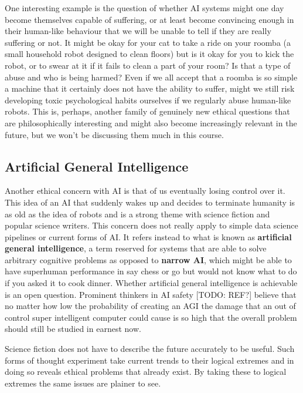 \documentclass[
]{book}
\theoremstyle{definition}
\theoremstyle{definition}
\theoremstyle{definition}
\theoremstyle{definition}
\theoremstyle{remark}
\begin{document}
One interesting example is the question of whether AI systems might one day become themselves capable of suffering, or at least become convincing enough in their human-like behaviour that we will be unable to tell if they are really suffering or not. It might be okay for your cat to take a ride on your roomba (a small household robot designed to clean floors) but is it okay for you to kick the robot, or to swear at it if it fails to clean a part of your room? Is that a type of abuse and who is being harmed? Even if we all accept that a roomba is so simple a machine that it certainly does not have the ability to suffer, might we still risk developing toxic psychological habits ourselves if we regularly abuse human-like robots. This is, perhaps, another family of genuinely new ethical questions that are philosophically interesting and might also become increasingly relevant in the future, but we won't be discussing them much in this course.

\hypertarget{artificial-general-intelligence}{%
\subsection{Artificial General Intelligence}\label{artificial-general-intelligence}}

Another ethical concern with AI is that of us eventually losing control over it. This idea of an AI that suddenly wakes up and decides to terminate humanity is as old as the idea of robots and is a strong theme with science fiction and popular science writers. This concern does not really apply to simple data science pipelines or current forms of AI. It refers instead to what is known as \textbf{artificial general intelligence}, a term reserved for systems that are able to solve arbitrary cognitive problems as opposed to \textbf{narrow AI}, which might be able to have superhuman performance in say chess or go but would not know what to do if you asked it to cook dinner. Whether artificial general intelligence is achievable is an open question. Prominent thinkers in AI safety {[}TODO: REF?{]} believe that no matter how low the probability of creating an AGI the damage that an out of control super intelligent computer could cause is so high that the overall problem should still be studied in earnest now.

Science fiction does not have to describe the future accurately to be useful. Such forms of thought experiment take current trends to their logical extremes and in doing so reveals ethical problems that already exist. By taking these to logical extremes the same issues are plainer to see.
\end{document}
